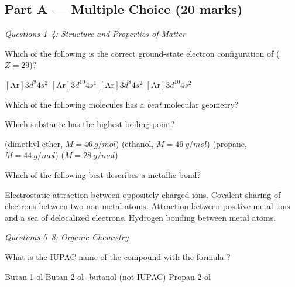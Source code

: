 \documentclass[addpoints]{exam}
\begin{document}
\newpage
\begin{questions}

\section*{Part A --- Multiple Choice (20 marks)}
\vspace{3mm}
\noindent\textit{Questions 1--4: Structure and Properties of Matter}
\vspace{3mm}

\question[1] Which of the following is the correct ground-state electron configuration of
 ($Z = 29$)?
\begin{choices}
    \choice $[\text{Ar}]3d^9 4s^2$
    \correctchoice $[\text{Ar}]3d^{10} 4s^1$
    \choice $[\text{Ar}]3d^8 4s^2$
    \choice $[\text{Ar}]3d^{10} 4s^2$
\end{choices}

\question[1] Which of the following molecules has a \textit{bent} molecular geometry?
\begin{choices}
    \choice {}
    \choice {}
    \correctchoice {}
    \choice {}
\end{choices}

\question[1] Which substance has the highest boiling point?
\begin{choices}
    \choice {} (dimethyl ether, $M = \SI{46}{g/mol}$)
    \correctchoice {} (ethanol, $M = \SI{46}{g/mol}$)
    \choice {} (propane, $M = \SI{44}{g/mol}$)
    \choice {} ($M = \SI{28}{g/mol}$)
\end{choices}

\question[1] Which of the following best describes a metallic bond?
\begin{choices}
    \choice Electrostatic attraction between oppositely charged ions.
    \choice Covalent sharing of electrons between two non-metal atoms.
    \correctchoice Attraction between positive metal ions and a sea of delocalized electrons.
    \choice Hydrogen bonding between metal atoms.
\end{choices}

\vspace{3mm}
\noindent\textit{Questions 5--8: Organic Chemistry}
\vspace{3mm}

\question[1] What is the IUPAC name of the compound with the formula
?
\begin{choices}
    \choice Butan-1-ol
    \correctchoice Butan-2-ol
    -butanol (not IUPAC)
    \choice Propan-2-ol
\end{choices}


\end{questions}
\end{document}
